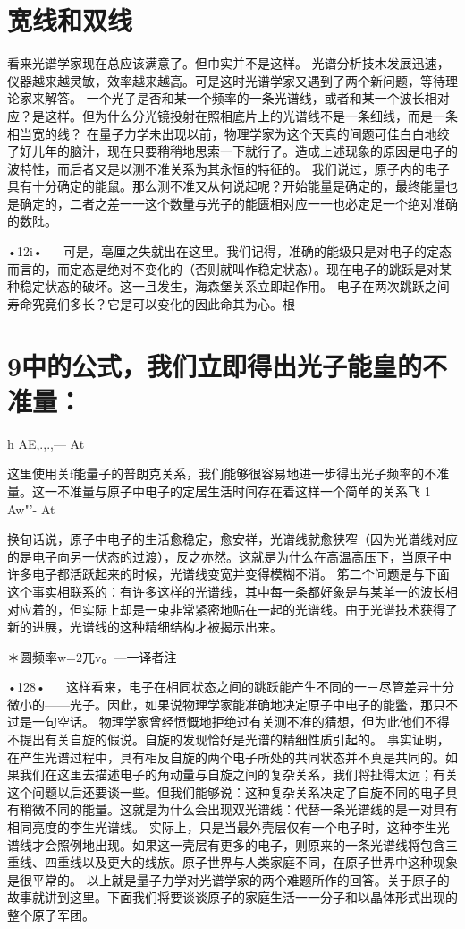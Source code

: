 \section{宽线和双线}

看来光谱学家现在总应该满意了。但巾实并不是这样。
光谱分析技木发展迅速，仪器越来越灵敏，效率越来越高。可是这时光谱学家又遇到了两个新问题，等待理论家来解答。
一个光子是否和某一个频率的一条光谱线，或者和某一个波长相对应？是这样。但为什么分光镜投射在照相底片上的光谱线不是一条细线，而是一条相当宽的线？
在量子力学未出现以前，物理学家为这个天真的间题可佳白白地绞了好儿年的脑汁，现在只要稍稍地思索一下就行了。造成上述现象的原因是电子的波特性，而后者又是以测不准关系为其永恒的特征的。
我们说过，原子内的电子具有十分确定的能鼠。那么测不准又从何说起呢？开始能量是确定的，最终能量也是确定的，二者之差一一这个数量与光子的能匮相对应一一也必定足一个绝对准确的数阰。

•12i•
  
可是，亳厘之失就出在这里。我们记得，准确的能级只是对电子的定态而言的，而定态是绝对不变化的（否则就叫作稳定状态）。现在电子的跳跃是对某种稳定状态的破坏。这一且发生，海森堡关系立即起作用。
电子在两次跳跃之间寿命究竟们多长？它是可以变化的因此命其为心。根\section{9中的公式，我们立即得出光子能皇的不准量：}

h
AE,.,.,—
At

这里使用关f能量子的普朗克关系，我们能够很容易地进一步得出光子频率的不准量。这一不准量与原子中电子的定居生活时间存在着这样一个简单的关系飞
1
Aw"'-
At

换旬话说，原子中电子的生活愈稳定，愈安祥，光谱线就愈狭窄（因为光谱线对应的是电子向另一伏态的过渡），反之亦然。这就是为什么在高温高压下，当原子中许多电子都活跃起来的时候，光谱线变宽并变得模糊不消。
笫二个问题是与下面这个事实相联系的：有许多这样的光谱线，其中每一条都好象是与某单一的波长相对应着的，但实际上却是一束非常紧密地贴在一起的光谱线。由于光谱技术获得了新的进展，光谱线的这种精细结构才被揭示出来。

＊圆频率w=2兀v。—一译者注

•128•
  
这样看来，电子在相同状态之间的跳跃能产生不同的一－尽管差异十分微小的——光子。因此，如果说物理学家能准确地决定原子中电子的能鳖，那只不过是一句空话。
物理学家曾经愤慨地拒绝过有关测不准的猜想，但为此他们不得不提出有关自旋的假说。自旋的发现恰好是光谱的精细性质引起的。
事实证明，在产生光谱过程中，具有相反自旋的两个电子所处的共同状态并不真是共同的。如果我们在这里去描述电子的角动量与自旋之间的复杂关系，我们将扯得太远；有关这个问题以后还要谈一些。但我们能够说：这种复杂关系决定了自旋不同的电子具有稍微不同的能量。这就是为什么会出现双光谱线：代替一条光谱线的是一对具有相同亮度的李生光谱线。
实际上，只是当最外壳层仅有一个电子时，这种李生光谱线才会照例地出现。如果这一壳层有更多的电子，则原来的一条光谱线将包含三重线、四重线以及更大的线族。原子世界与人类家庭不同，在原子世界中这种现象是很平常的。
以上就是量子力学对光谱学家的两个难题所作的回答。关于原子的故事就讲到这里。下面我们将要谈谈原子的家庭生活一一分子和以晶体形式出现的整个原子军团。

